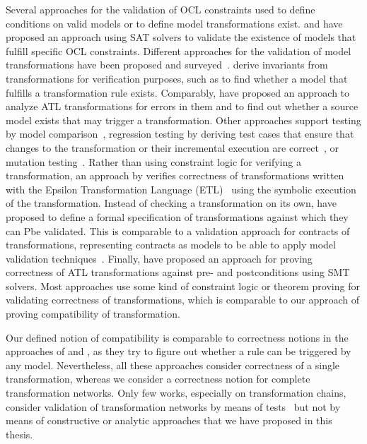 Several approaches for the validation of \gls{OCL} constraints used to define conditions on valid models or to define model transformations exist.
\textcite{kuhlmann2011a} and \textcite{gonzalez2012a} have proposed an approach using SAT solvers to validate the existence of models that fulfill specific \gls{OCL} constraints.
Different approaches for the validation of model transformations have been proposed and surveyed~\cite{calegari2013verificationTransformations-ENTCS,rahim2015SurveyTransformationVerification-SoSym}.
\textcite{cabot2010VerificationInvariants-JSS} derive invariants from transformations for verification purposes, such as to find whether a model that fulfills a transformation rule exists.
Comparably, \textcite{cuadrado2017tse} have proposed an approach to analyze \gls{ATL} transformations for errors in them and to find out whether a source model exists that may trigger a transformation.
Other approaches support testing by model comparison~\cite{kolovos2006transformationTesting-WGIMM}, regression testing by deriving test cases that ensure that changes to the transformation or their incremental execution are correct~\cite{troy2018inferenceTransformations-JSS}, or mutation testing~\cite{troya2015imutationTestingTransformations-ICSTW}.
Rather than using constraint logic for verifying a transformation, an approach by \textcite{azizi2017ContractVerification-ICCKE} verifies correctness of transformations written with the Epsilon Transformation Language (ETL)~\cite{kolovos2014epsilon-Book} using the symbolic execution of the transformation.
Instead of checking a transformation on its own, \textcite{vallecillo2012FormalTesting-FMMDE} have proposed to define a formal specification of transformations against which they can Pbe validated.
This is comparable to a validation approach for contracts of transformations, representing contracts as models to be able to apply model validation techniques~\cite{braga2014consistencyTransformations-SCP}.
Finally, \textcite{buettner2012models} have proposed an approach for proving correctness of \gls{ATL} transformations against pre- and postconditions using \gls{SMT} solvers.
Most approaches use some kind of constraint logic or theorem proving for validating correctness of transformations, which is comparable to our approach of proving compatibility of transformation.

Our defined notion of compatibility is comparable to correctness notions in the approaches of \textcite{cuadrado2017tse} and \textcite{cabot2010VerificationInvariants-JSS}, as they try to figure out whether a rule can be triggered by any model.
Nevertheless, all these approaches consider correctness of a single transformation, whereas we consider a correctness notion for complete transformation networks.
Only few works, especially on transformation chains, consider validation of transformation networks by means of tests~\cite{bauer2011combiningCoverageChains-ICMT} but not by means of constructive or analytic approaches that we have proposed in this thesis.



